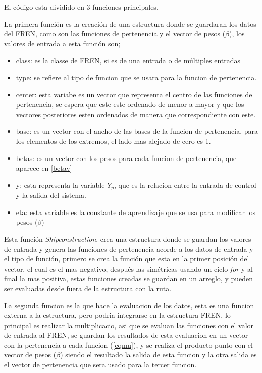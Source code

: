     El código esta dividido en 3 funciones principales.
    
    La primera función es la creación de una estructura donde se guardaran los datos del FREN, como son las funciones de pertenencia y el vector de pesos ($\beta$), los valores de entrada a esta función son; 
   
   \begin{itemize}
   	\item class: es la classe de FREN, si es de una entrada o de múltiples entradas
   	\item type: se refiere al tipo de funcion que se usara para la funcion de pertenencia.
   	\item center: esta variabe es un vector que representa el centro de las funciones de pertenencia, se espera que este este ordenado de menor a mayor y que los vectores posteriores esten ordenados de manera que correspondiente con este.
   	\item base: es un vector con el ancho de las bases de la funcion de pertenencia, para los elementos de los extremos, el lado mas alejado de cero es 1.
   	\item betas: es un vector con los pesos para cada funcion de pertenencia, que aparece en \cref{betav}
   	\item y: esta representa la variable $Y_p$, que es la relacion entre la entrada de control y la salida del sistema.
   	\item eta: esta variable es la constante de aprendizaje que se usa para modificar los pesos ($\beta$)
   \end{itemize}
   
   Esta función \textit{Shipconstruction}, crea una estructura donde se guardan los valores de entrada y genera las funciones de pertenencia acorde a los datos de entrada y el tipo de función, primero se crea la función que esta en la primer posición del vector, el cual es el mas negativo, después las simétricas usando un ciclo \textit{for} y al final la mas positiva, estas funciones creadas se guardan en un arreglo, y pueden ser evaluadas desde fuera de la estructura con la ruta.
   
   
   La segunda funcion es la que hace la evaluacion de los datos, esta es una funcion externa a la estructura, pero podria integrarse en la estructura FREN, lo principal es realizar la multiplicacio, asi que se evaluan las funciones con el valor de entrada al FREN, se guardan los resultados de esta evaluacion en un vector con la pertenencia a cada funcion (\cref{eqmu}), y se realiza el producto punto con el vector de pesos ($\beta$) siendo el resultado la salida de esta funcion y la otra salida es el vector de pertenencia que sera usado para la tercer funcion.
   
